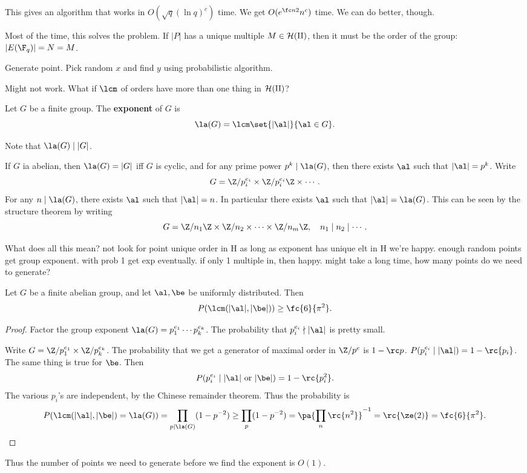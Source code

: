 This gives an algorithm that works in $O(\sqrt q(\ln q)^c)$ time. %
We get $O(e^{\fc n2}n^c)$ time. We can do better, though.

Most of the time, this solves the problem. If $|P|$ has a unique multiple $M\in \cal H(q)$, then it must be the order of the group: $|E(\F_q)|=N=M$.

Generate point. Pick random $x$ and find $y$ using probabilistic algorithm.

Might not work. What if $\lcm$ of orders have more than one thing in $\cal H(q)$?
\begin{df}
Let $G$ be a finite group. The \textbf{exponent} of $G$ is
\[
\la(G)=\lcm\set{|\al|}{\al\in G}.
\]
\end{df}
Note that $\la(G)\mid |G|$.

If $G$ ia abelian, then $\la(G)=|G|$ iff $G$ is cyclic, and for any prime power $p^k\mid \la(G)$, then there exists $\al$ such that $|\al|=p^k$. Write
\[
G=\Z/p_i^{e_i}\times \Z/p_i^{e_i}\Z\times \cdots.
\]
For any $n\mid \la(G)$, there exists $\al$ such that $|\al|=n$. In particular there exists $\al$ such that $|\al|=\la(G)$. This can be seen by the structure theorem by writing
\[
G=\Z/n_1\Z\times \Z/n_2\times \cdots \times \Z/n_m\Z, \quad n_1\mid n_2\mid \cdots.
\]

What does all this mean?
not look for point unique order in H
as long as exponent has unique elt in H we're happy.
enough random points get group exponent.
with prob 1 get exp eventually.
if only 1 multiple in, then happy.
might take a long time, how many points do we need to generate?

\begin{thm}
Let $G$ be a finite abelian group, and let $\al,\be$ be uniformly distributed. Then
\[
P(\lcm(|\al|,|\be|))\ge \fc{6}{\pi^2}.
\]
\end{thm}
\begin{proof}
Factor the group exponent $\la(G)=p_1^{e_1}\cdots p_k^{e_k}$. The probability that $p_i^{e_i}\nmid |\al|$ is pretty small.

Write $G=\Z/p_1^{e_1}\times \Z/p_k^{e_k}$. %
The probability that we get a generator of maximal order in $\Z/p^{e}$ is $1-\rc p$. $P(p_i^{e_i}\mid |\al|)=1-\rc{p_i}$. The same thing is true for $\be$. Then
\[
P(p_i^{e_i}\mid |\al|\text{ or }|\be|)=1-\rc{p_i^2}.
\]
The various $p_i$'s are independent, by the Chinese remainder theorem. Thus the probability is
\[
P(\lcm(|\al|,|\be|)=\la(G))=\prod_{p\mid \la(G)} (1-p^{-2})\ge\prod_p (1-p^{-2})=\pa{\prod_n \rc{n^2}}^{-1}=\rc{\ze(2)}=\fc{6}{\pi^2}. 
\]
\end{proof}
Thus the number of points we need to generate before we find the exponent is $O(1)$.

